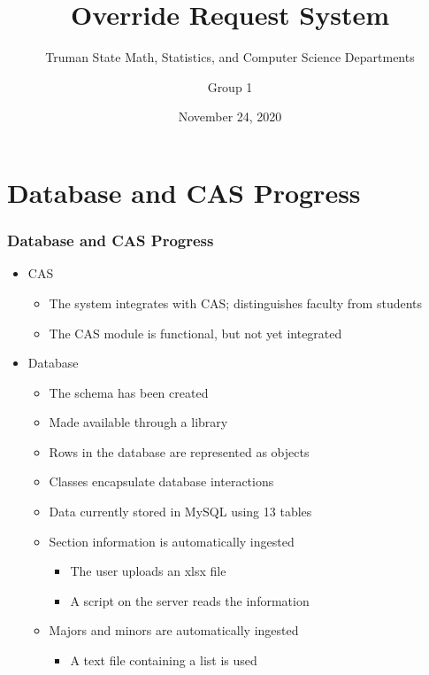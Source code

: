 \documentclass[aspectratio=169, t]{beamer}
\title{Override Request System}
\subtitle{Truman State Math, Statistics, and Computer Science Departments}
\author[Group 1]{Group 1}
\date{November 24, 2020}
\begin{document}
\maketitle

\section{Database and CAS Progress}
\begin{frame}
\frametitle{Database and CAS Progress}
\begin{itemize}
 \item CAS
 \begin{itemize}
  \item The system integrates with CAS; distinguishes faculty from students
  \item The CAS module is functional, but not yet integrated
 \end{itemize}
 \item Database
 \begin{itemize}
  \item The schema has been created
  \item Made available through a library
  \item Rows in the database are represented as objects
  \item Classes encapsulate database interactions
  \item Data currently stored in MySQL using 13 tables
  \item Section information is automatically ingested
  \begin{itemize}
   \item The user uploads an xlsx file
   \item A script on the server reads the information
  \end{itemize}
  \item Majors and minors are automatically ingested
  \begin{itemize}
   \item A text file containing a list is used
  \end{itemize}
 \end{itemize}
\end{itemize}
\end{frame}
\end{document}
